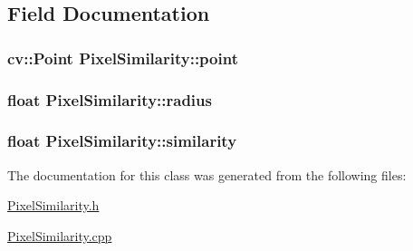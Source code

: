 \subsection{Field Documentation}
\hypertarget{classPixelSimilarity_a98e029104a5ee11b23554b02d7ac30e6}{
\subsubsection[{point}]{\setlength{\rightskip}{0pt plus 5cm}cv::Point {\bf PixelSimilarity::point}}}
\label{classPixelSimilarity_a98e029104a5ee11b23554b02d7ac30e6}
\hypertarget{classPixelSimilarity_a4da3847fd0812a4c4fc415a20697acf4}{
\subsubsection[{radius}]{\setlength{\rightskip}{0pt plus 5cm}float {\bf PixelSimilarity::radius}}}
\label{classPixelSimilarity_a4da3847fd0812a4c4fc415a20697acf4}
\hypertarget{classPixelSimilarity_a4fa484885e6d7d38078c6d75e4f4d72e}{
\subsubsection[{similarity}]{\setlength{\rightskip}{0pt plus 5cm}float {\bf PixelSimilarity::similarity}}}
\label{classPixelSimilarity_a4fa484885e6d7d38078c6d75e4f4d72e}


The documentation for this class was generated from the following files:\begin{DoxyCompactItemize}
\item 
\hyperlink{PixelSimilarity_8h}{PixelSimilarity.h}\item 
\hyperlink{PixelSimilarity_8cpp}{PixelSimilarity.cpp}\end{DoxyCompactItemize}
